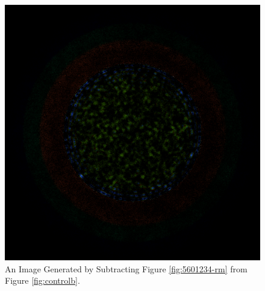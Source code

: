 \begin{figure}[H]
\centering
\includegraphics[width=0.6\linewidth]{figures/shuffle/diff-5601234}
\caption{An Image Generated by Subtracting Figure \ref{fig:5601234-rm} from Figure \ref{fig:controlb}.}
\label{fig:diff-5601234}
\end{figure}